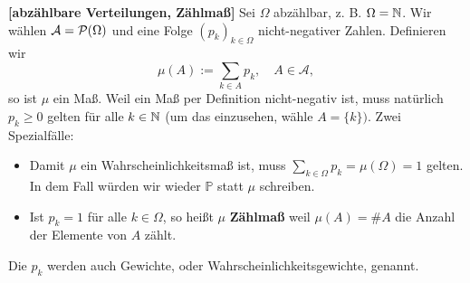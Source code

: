 \begin{beispiel}\label{zahl}  \textbf{[abzählbare Verteilungen, Z\"ahlma\ss]}
	Sei $\Omega$ abzählbar, z. B. $\Omega=\mathbb{N}$. Wir w\"ahlen $\mathcal{A} = \mathcal{P}(\Omega)$ und eine Folge $(p_k)_{k \in \Omega}$ nicht-negativer Zahlen. Definieren wir $$\mu(A):= \sum\limits_{k \in A} p_k, \quad A \in \mathcal A,$$ so ist $\mu$ ein Ma\ss. Weil ein Ma\ss{} per Definition nicht-negativ ist, muss nat\"urlich $p_k\geq 0$ gelten f\"ur alle $k\in \mathbb{N}$ (um das einzusehen, w\"ahle $A=\{k\})$. Zwei Spezialf\"alle:
	\begin{itemize}
		\item Damit $\mu$ ein Wahrscheinlichkeitsma\ss{} ist, muss $\sum_{k\in \Omega} p_k=\mu(\Omega)=1$ gelten. In dem Fall w\"urden wir wieder $\mathbb P$ statt $\mu$ schreiben.
		\item Ist $p_k=1$ f\"ur alle $k\in\Omega$, so hei\ss t $\mu$ \textbf{Z\"ahlma\ss} weil $\mu(A)=\# A$ die Anzahl der Elemente von $A$ z\"ahlt.
	\end{itemize}
	Die $p_k$ werden auch Gewichte, oder Wahrscheinlichkeitsgewichte, genannt.
\end{beispiel}

